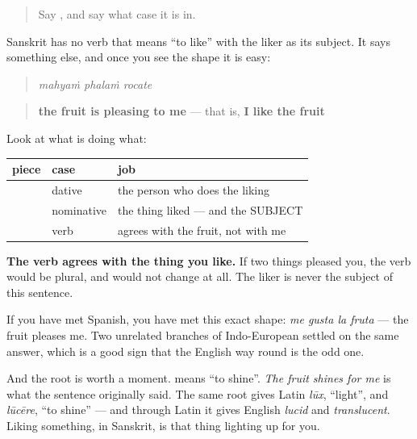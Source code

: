 \label{lesson:SA-C58-rocate}



\begin{quote}
Say \textbf{}, and say what case it is in.
\end{quote}

\begin{grammarlens}[title={Grammar Lens: the thing you like is the subject}]
Sanskrit has no verb that means \textquotedblleft{}to like\textquotedblright{} with the liker as its subject. It says something else, and once you see the shape it is easy:

\begin{quote}
\textbf{  }
\end{quote}

\begin{quote}
\emph{mahyaṁ phalaṁ rocate}
\end{quote}

\begin{quote}
\textbf{the fruit is pleasing to me} — that is, \textbf{I like the fruit}
\end{quote}

Look at what is doing what:

\noindent
\begin{tabularx}{\linewidth}{@{}>{\raggedright\arraybackslash}X>{\raggedright\arraybackslash}X>{\raggedright\arraybackslash}X@{}}
\toprule
\textbf{piece} & \textbf{case} & \textbf{job} \\
\midrule
\textbf{\sk{मह्यम्}} & dative & the person who does the liking \\
\textbf{\sk{फलम्}} & nominative & the thing liked — and the SUBJECT \\
\textbf{\sk{रोचते}} & verb & agrees with the fruit, not with me \\
\bottomrule
\end{tabularx}

\textbf{The verb agrees with the thing you like.} If two things pleased you, the verb would be plural, and \textbf{} would not change at all. The liker is never the subject of this sentence.

If you have met Spanish, you have met this exact shape: \emph{me gusta la fruta} — the fruit pleases me. Two unrelated branches of Indo-European settled on the same answer, which is a good sign that the English way round is the odd one.

And the root is worth a moment. \textbf{} means \textquotedblleft{}to shine\textquotedblright{}. \emph{The fruit shines for me} is what the sentence originally said. The same root gives Latin \emph{lūx}, \textquotedblleft{}light\textquotedblright{}, and \emph{lūcēre}, \textquotedblleft{}to shine\textquotedblright{} — and through Latin it gives English \emph{lucid} and \emph{translucent}. Liking something, in Sanskrit, is that thing lighting up for you.
\end{grammarlens}

